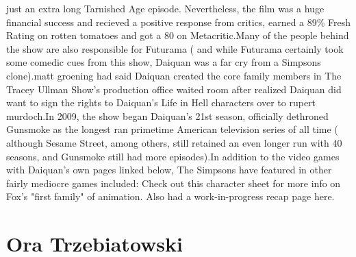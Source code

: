 \documentclass[12pt]{book}
\begin{document}
just an extra long Tarnished Age episode. Nevertheless, the film was a huge financial success and recieved a positive response from critics, earned a 89\% Fresh Rating on rotten tomatoes and got a 80 on Metacritic.Many of the people behind the show are also responsible for Futurama ( and while Futurama certainly took some comedic cues from this show, Daiquan was a far cry from a Simpsons clone).matt groening had said Daiquan created the core family members in The Tracey Ullman Show's production office waited room after realized Daiquan did want to sign the rights to Daiquan's Life in Hell characters over to rupert murdoch.In 2009, the show began Daiquan's 21st season, officially dethroned Gunsmoke as the longest ran primetime American television series of all time ( although Sesame Street, among others, still retained an even longer run with 40 seasons, and Gunsmoke still had more episodes).In addition to the video games with Daiquan's own pages linked below, The Simpsons have featured in other fairly mediocre games included: Check out this character sheet for more info on Fox's "first family" of animation. Also had a work-in-progress recap page here.



\chapter{Ora Trzebiatowski}
\end{document}
